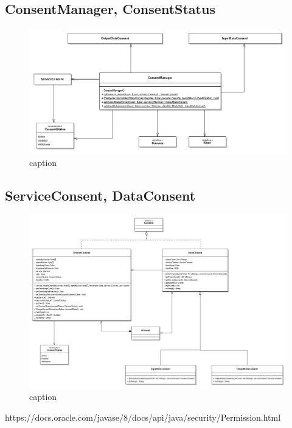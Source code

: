 \subsection{ConsentManager, ConsentStatus}
\begin{figure} [h]
	\includegraphics[width=\linewidth]{pictures/Auth-CM.png}
	\caption{caption}
	\label{fig:Auth-CM}
\end{figure}

\subsection{ServiceConsent, DataConsent}
\label{subsec:P-ServiceConsentDataConsent}
\begin{figure} [h]
	\includegraphics[width=\linewidth]{pictures/Auth-Consents.png}
	\caption{caption}
	\label{fig:Auth-Consents}
\end{figure}
https://docs.oracle.com/javase/8/docs/api/java/security/Permission.html

